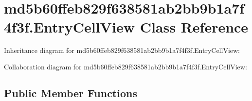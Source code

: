 \hypertarget{classmd5b60ffeb829f638581ab2bb9b1a7f4f3f_1_1_entry_cell_view}{}\section{md5b60ffeb829f638581ab2bb9b1a7f4f3f.\+Entry\+Cell\+View Class Reference}
\label{classmd5b60ffeb829f638581ab2bb9b1a7f4f3f_1_1_entry_cell_view}


Inheritance diagram for md5b60ffeb829f638581ab2bb9b1a7f4f3f.\+Entry\+Cell\+View\+:


Collaboration diagram for md5b60ffeb829f638581ab2bb9b1a7f4f3f.\+Entry\+Cell\+View\+:
\subsection*{Public Member Functions}
